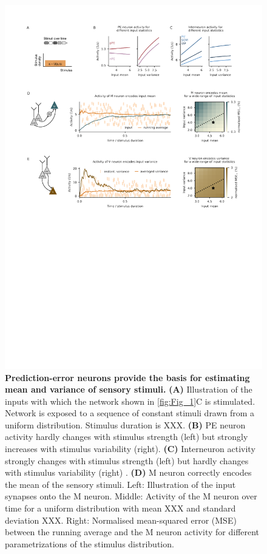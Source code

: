 \documentclass[10pt,a4paper,draft]{article}
\begin{document}
\begin{figure}[t!]
	\centering
    \includegraphics[width=1\linewidth]{../results/figures/final/Fig_2}
\caption{\footnotesize{\bf Prediction-error neurons provide the basis for estimating mean and variance of sensory stimuli.\newline} 
{\bf (A)} Illustration of the inputs with which the network shown in \ref{fig:Fig_1}C is stimulated. Network is exposed to a sequence of constant stimuli drawn from a uniform distribution. Stimulus duration is XXX.
{\bf (B)} PE neuron activity hardly changes with stimulus strength (left) but strongly increases with stimulus variability (right).
{\bf (C)} Interneuron activity strongly changes with stimulus strength (left) but hardly changes with stimulus variability (right) .
{\bf (D)} M neuron correctly encodes the mean of the sensory stimuli. Left: Illustration of the input synapses onto the M neuron. Middle: Activity of the M neuron over time for a uniform distribution with mean XXX and standard deviation XXX. Right: Normalised mean-squared error (MSE) between the running average and the M neuron activity for different parametrizations of the stimulus distribution.
}
\end{figure}
\end{document}
